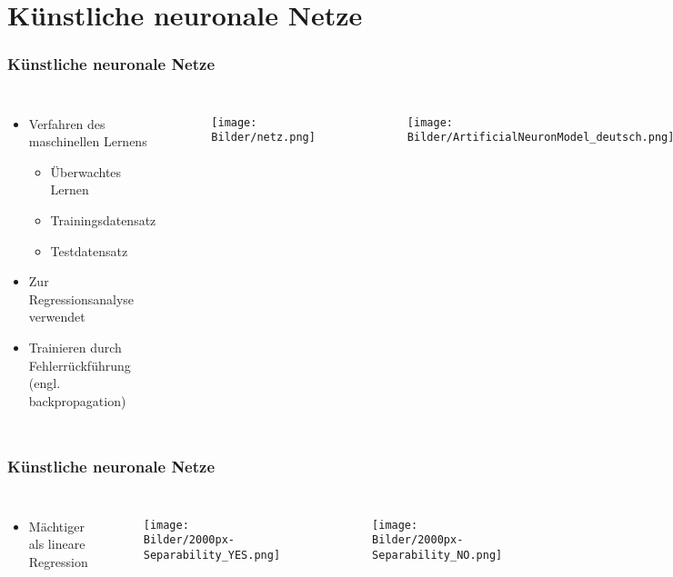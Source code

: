 \documentclass{beamer}
\begin{document}
\section{Künstliche neuronale Netze}
\begin{frame}
\frametitle{Künstliche neuronale Netze}
\begin{columns}
\begin{itemize}
	\item Verfahren des maschinellen Lernens
	\begin{itemize}
		\item Überwachtes Lernen
		\item Trainingsdatensatz
		\item Testdatensatz
	\end{itemize}
	\item Zur Regressionsanalyse verwendet
	\item Trainieren durch Fehlerrückführung (engl. backpropagation)
\end{itemize}

\begin{figure}
	\texttt{[image: Bilder/netz.png]}
\end{figure}

\begin{figure}
	\texttt{[image: Bilder/ArtificialNeuronModel\_deutsch.png]}
\end{figure}
\end{columns}
\end{frame}

\begin{frame}
\frametitle{Künstliche neuronale Netze}
\begin{columns}
\begin{itemize}
	\item Mächtiger als lineare Regression
\end{itemize}

\begin{figure}
	\texttt{[image: Bilder/2000px-Separability\_YES.png]}
\end{figure}
\begin{figure}
	\texttt{[image: Bilder/2000px-Separability\_NO.png]}
\end{figure}
\end{columns}
\end{frame}
\end{document}
